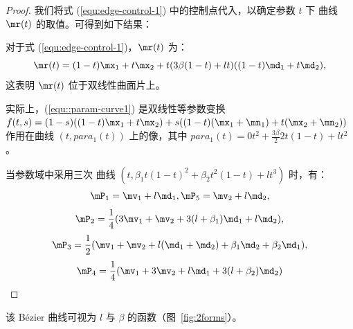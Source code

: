\begin{proof}
我们将式 (\ref{equ:edge-control-1}) 中的控制点代入，以确定参数 $t$ 下 \Bezier 曲线 $\mr(t)$ 的取值。可得到如下结果：

对于式 (\ref{equ:edge-control-1})，$\mr(t)$ 为：
\begin{equation}\label{equ::param-curve1}
\mr(t)=(1-t) \mx_1+t \mx_2+t (3\beta(1-t)+l t)((1-t)\md_1+t\md_2),
\end{equation}
这表明 $\mr(t)$ 位于双线性曲面片上。

实际上，(\ref{equ::param-curve1}) 是双线性等参数变换
$f(t,s)=(1-s)((1-t)\mx_1+t \mx_2)+s((1-t)(\mx_1+\mn_1)+t(\mx_2+\mn_2))$
作用在曲线 $(t,para_1(t))$ 上的像，其中
$para_1(t)=0 t^2+\frac{3\beta}{2} 2t(1-t)+l t^2$。

当参数域中采用三次 \Bezier 曲线
$(t,\beta_1 t(1-t)^2+\beta_2 t^2(1-t)+l t^3)$ 时，有：
$$\mP_1=\mv_1+l \md_1,\mP_5=\mv_2+l \md_2,$$
$$\mP_2=\frac{1}{4}(3\mv_1+\mv_2 +3(l+\beta_1) \md_1+l \md_2),$$
$$\mP_3=\frac{1}{2}(\mv_1+\mv_2+l(\md_1+\md_2)+\beta_1 \md_2+\beta_2 \md_1),$$
$$\mP_4=\frac{1}{4}(\mv_1+3\mv_2+l \md_1+3(l+\beta_2)\md_2)$$
\end{proof}
该 B\'{e}zier 曲线可视为 $l$ 与 $\beta$ 的函数（图~\ref{fig:2forms}）。



